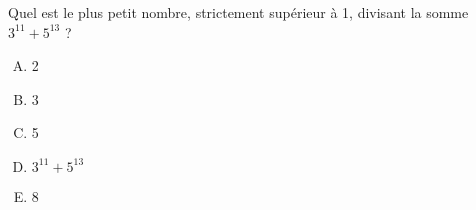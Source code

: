 Quel est le plus petit nombre, strictement supérieur à 1, divisant la
somme $3^{11}+5^{13}$ ?
\begin{multicols}{5}
  \begin{enumerate}[A)]
  \item 2
  \item 3
  \item 5
  \item $3^{11}+5^{13}$
  \item 8
  \end{enumerate}
\end{multicols}